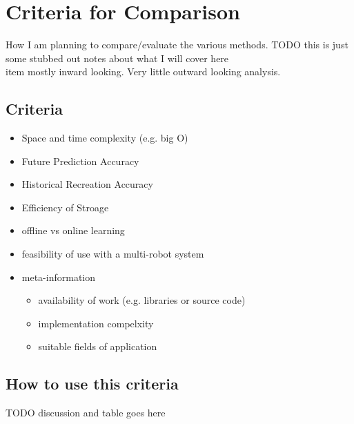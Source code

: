 
  \chapter{Criteria for Comparison}
  How I am planning to compare/evaluate the various methods.
  TODO this is just some stubbed out notes about what I will cover here \\
  item mostly inward looking. Very little outward looking analysis.


  \section{ Criteria }
  \begin{itemize}
    \item Space and time complexity (e.g. big O)
    \item Future Prediction Accuracy
    \item Historical Recreation Accuracy
    \item Efficiency of Stroage
    \item offline vs online learning
    \item feasibility of use with a multi-robot system

    \item meta-information
    \begin{itemize}
      \item availability of work (e.g. libraries or source code)
      \item implementation compelxity
      \item suitable fields of application
    \end{itemize}
  \end{itemize}



  \section{ How to use this criteria }
  TODO discussion and table goes here

